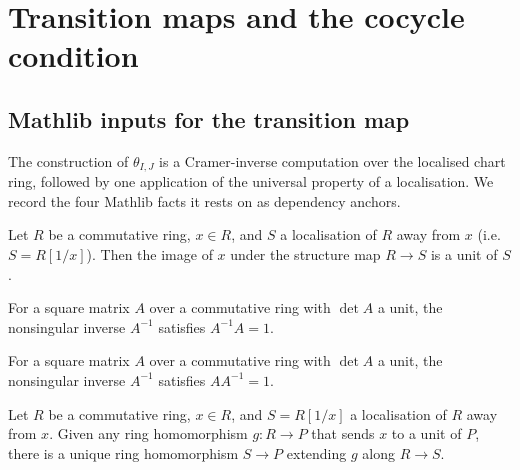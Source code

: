 \section{Transition maps and the cocycle condition}
\label{mk-sec:gr_transition}

\subsection*{Mathlib inputs for the transition map}

The construction of \(\theta_{I,J}\) is a Cramer-inverse computation over the
localised chart ring, followed by one application of the universal property of a
localisation. We record the four Mathlib facts it rests on as dependency
anchors.

\begin{lemma}
  \label{mk-lem:mathlib_away_algebraMap_isUnit}
  \mathlibok

  Let \(R\) be a commutative ring, \(x \in R\), and \(S\) a localisation of \(R\)
  away from \(x\) (i.e.\ \(S = R[1/x]\)). Then the image of \(x\) under the
  structure map \(R \to S\) is a unit of \(S\).
\end{lemma}

\begin{lemma}
  \label{mk-lem:mathlib_nonsing_inv_mul}
  \mathlibok

  For a square matrix \(A\) over a commutative ring with \(\det A\) a unit, the
  nonsingular inverse \(A^{-1}\) satisfies \(A^{-1} A = 1\).
\end{lemma}

\begin{lemma}
  \label{mk-lem:mathlib_mul_nonsing_inv}
  \mathlibok

  For a square matrix \(A\) over a commutative ring with \(\det A\) a unit, the
  nonsingular inverse \(A^{-1}\) satisfies \(A A^{-1} = 1\).
\end{lemma}

\begin{lemma}
  \label{mk-lem:mathlib_away_lift}
  \mathlibok

  Let \(R\) be a commutative ring, \(x \in R\), and \(S = R[1/x]\) a localisation
  of \(R\) away from \(x\). Given any ring homomorphism \(g : R \to P\) that
  sends \(x\) to a unit of \(P\), there is a unique ring homomorphism
  \(S \to P\) extending \(g\) along \(R \to S\).
\end{lemma}

